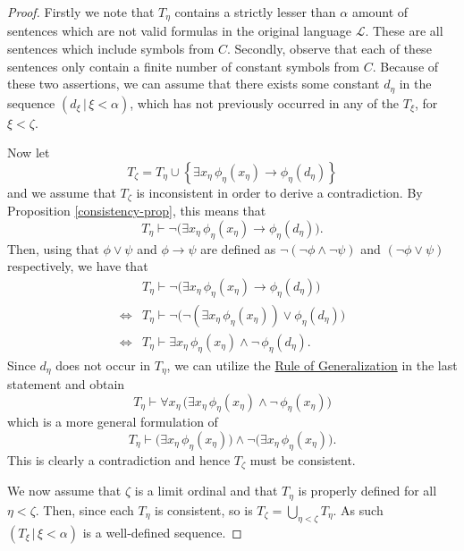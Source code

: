 \documentclass[../../main.tex]{subfiles}
\begin{document}
\begin{proof}
    Firstly we note that $T_\eta$ contains a strictly lesser than $\alpha$ amount of sentences which are not valid formulas in the original language $\mathcal{L}$.
    These are all sentences which include symbols from $C$.
    Secondly, observe that each of these sentences only contain a finite number of constant symbols from $C$.
    Because of these two assertions, we can assume that there exists some constant $d_\eta$ in the sequence $\left(d_\xi \, \vert \, \xi < \alpha\right)$,
    which has not previously occurred in any of the $T_\xi$, for $\xi < \zeta$.

    Now let 
    $$T_\zeta = T_\eta \cup \left\{\exists x_\eta \, \phi_\eta(x_\eta) \rightarrow \phi_\eta(d_\eta)\right\}$$
    and we assume that $T_\zeta$ is inconsistent in order to derive a contradiction.
    By Proposition \ref{consistency-prop}, this means that $$T_\eta \vdash \lnot \big(\exists x_\eta \, \phi_\eta(x_\eta) \rightarrow \phi_\eta(d_\eta)\big).$$
    Then, using that $\phi \vee \psi$ and $\phi \rightarrow \psi$ are defined as $\lnot \left(\lnot \phi \wedge \lnot \psi\right)$ and $\left(\lnot \phi \vee \psi\right)$ respectively,
    we have that
    \begin{align*}
             & T_\eta \vdash \lnot \big(\exists x_\eta \, \phi_\eta(x_\eta) \rightarrow \phi_\eta(d_\eta)\big) \\
        \iff & T_\eta \vdash \lnot \big(\lnot\left(\exists x_\eta \, \phi_\eta(x_\eta)\right) \vee \phi_\eta(d_\eta)\big) \\
        \iff & T_\eta \vdash \exists x_\eta \, \phi_\eta(x_\eta) \wedge \lnot \, \phi_\eta(d_\eta).
    \end{align*}
    Since $d_\eta$ does not occur in $T_\eta$, we can utilize the \hyperref[generalization-rule]{Rule of Generalization} in the last statement and obtain 
    $$T_\eta \vdash \forall x_\eta \, \big(\exists x_\eta \, \phi_\eta(x_\eta) \wedge \lnot \, \phi_\eta(x_\eta)\big)$$
    which is a more general formulation of 
    $$T_\eta \vdash \big(\exists x_\eta \, \phi_\eta(x_\eta)\big) \wedge \lnot \big(\exists x_\eta \, \phi_\eta(x_\eta)\big).$$
    This is clearly a contradiction and hence $T_\zeta$ must be consistent.

    We now assume that $\zeta$ is a limit ordinal and that $T_\eta$ is properly defined for all $\eta <\zeta$.
    Then, since each $T_\eta$ is consistent, so is $T_\zeta = \bigcup_{\eta < \zeta} T_\eta$.
    As such $\left(T_\xi \, \vert \, \xi < \alpha\right)$ is a well-defined sequence.


\end{proof}
\end{document}
